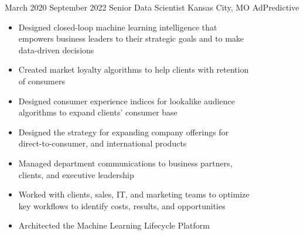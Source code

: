 
\Experience
{March 2020}
{September 2022}
{Senior Data Scientist}
{Kansas City, MO}
{AdPredictive}
{\begin{itemize}
     \item Designed closed-loop machine learning intelligence that
     \\ empowers business leaders to their strategic goals and to make
     \\ data-driven decisions
     \item Created market loyalty algorithms to help clients with retention
     \\ of consumers
     \item Designed consumer experience indices for lookalike audience
     \\ algorithms to expand clients' consumer base
     \item Designed the strategy for expanding company offerings for
     \\ direct-to-consumer, and international products
     \item Managed department communications to business partners,
     \\ clients, and executive leadership
     \item Worked with clients, sales, IT, and marketing teams to optimize
     \\ key workflows to identify costs, results, and opportunities
     \item Architected the Machine Learning Lifecycle Platform
\end{itemize}}

\vspace*{0.05 in}

